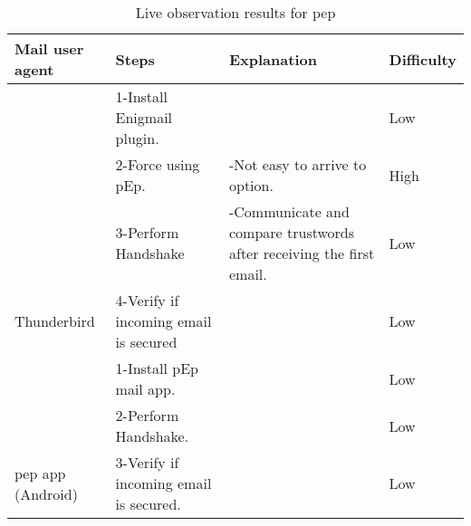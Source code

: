 {\def\arraystretch{1.2}\tabcolsep=3pt
\begin{table*}%
	\scriptsize
	\centering
	\begin{tabularx}{\textwidth}{|l|l|l|l|}
		\hline
		\textbf{Mail user agent}		& \textbf{Steps}   & \textbf{Explanation}  & \textbf{Difficulty}							\\ \hline
		& 1-Install Enigmail plugin.	&      						 											& Low	\\ \cline{2-4}
		& 2-Force using pEp.			& -Not easy to arrive to option.& {\color[HTML]{FE0000} High} \\ \cline{2-4}
		& 3-Perform Handshake			& -Communicate and compare trustwords after receiving the first email.	& Low	\\ \cline{2-4}
		{Thunderbird}					& 4-Verify if incoming email is secured  &                 				& Low	\\ \hline
		& 1-Install pEp mail app.		&                                                                   	& Low	\\ \cline{2-4}
		& 2-Perform Handshake.			&																		& Low	\\ \cline{2-4}
		{\acrshort{pep} app (Android)}     					& 3-Verify if incoming email is secured. &								& Low	\\
		\hline               
	\end{tabularx}
	\caption{Live observation results for \acrshort{pep} \label{tab:ResultspEp}}
\end{table*}	
}